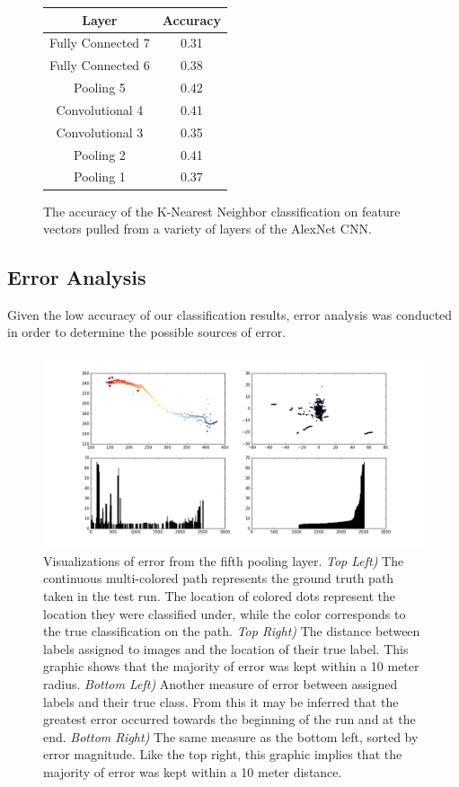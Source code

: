 \documentclass[letterpaper, 12 pt, conference]{ieeeconf}  %
\begin{document}
\begin{figure}[h]
\centering
\begin{tabular}{| c | c |}
\hline
\textbf{Layer} & \textbf{Accuracy} \\
\hline
Fully Connected 7 & 0.31 \\ 
Fully Connected 6 & 0.38 \\
Pooling 5 & 0.42 \\
Convolutional 4 & 0.41 \\
Convolutional 3 & 0.35 \\
Pooling 2 & 0.41 \\
Pooling 1 & 0.37 \\
\hline
\end{tabular}
\caption{The accuracy of the K-Nearest Neighbor classification on feature vectors pulled from a variety of layers of the AlexNet CNN. }
\label{classification_results}
\end{figure}

\subsection{Error Analysis}

Given the low accuracy of our classification results, error analysis was conducted in order to determine the possible sources of error. 

\begin{figure}[h]
\centering
\includegraphics[scale=0.25]{error_pool5}
\caption{Visualizations of error from the fifth pooling layer. \textit{Top Left)} The continuous multi-colored path represents the ground truth path taken in the test run. The location of colored dots represent the location they were classified under, while the color corresponds to the true classification on the path.  \textit{Top Right)} The distance between labels assigned to images and the location of their true label. This graphic shows that the majority of error was kept within a 10 meter radius. \textit{Bottom Left)} Another measure of error between assigned labels and their true class. From this it may be inferred that the greatest error occurred towards the beginning of the run and at the end. \textit{Bottom Right)} The same measure as the bottom left, sorted by error magnitude. Like the top right, this graphic implies that the majority of error was kept within a 10 meter distance.}
\label{error_graphs}
\end{figure}
\end{document}
